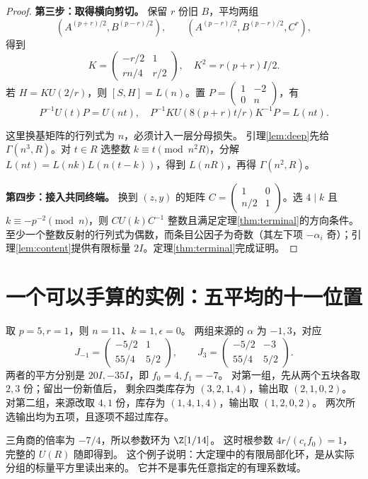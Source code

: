 \begin{proof}
\par\noindent\textbf{第三步：取得横向剪切。}
保留 $r$ 份旧 $B$，平均两组
\[
(A^{(p+r)/2},B^{(p-r)/2}),\qquad
(A^{(p-r)/2},B^{(p-r)/2},C^r),
\]
得到
\[
K=\begin{pmatrix}-r/2&1\\rn/4&r/2\end{pmatrix},\quad K^2=r(p+r)I/2.
\]
若 $H=KU(2/r)$，则 $[S,H]=L(n)$。置 $P=\left(\begin{smallmatrix}1&-2\\0&n\end{smallmatrix}\right)$，有
\[
P^{-1}U(t)P=U(nt),\quad
P^{-1}KU(8(p+r)t/r)K^{-1}P=L(nt).
\]

这里换基矩阵的行列式为 $n$，必须计入一层分母损失。
引理\ref{lem:deep}先给 $\Gamma(n^3,R)$。对 $t\in R$ 选整数 $k\equiv t\pmod{n^2R}$，分解 $L(nt)=L(nk)L(n(t-k))$，得到 $L(nR)$，再得 $\Gamma(n^2,R)$。

\par\noindent\textbf{第四步：接入共同终端。}
换到 $(z,y)$ 的矩阵 $C=\left(\begin{smallmatrix}1&0\\n/2&1\end{smallmatrix}\right)$。选 $4\mid k$ 且 $k\equiv-p^{-2}\pmod n$，则 $CU(k)C^{-1}$ 整数且满足定理\ref{thm:terminal}的方向条件。至少一个整数反射的行列式为偶数，而条目公因子为奇数（其左下项 $-\alpha_i$ 奇）；引理\ref{lem:content}提供有限标量 $2I$。定理\ref{thm:terminal}完成证明。
\end{proof}

\section{一个可以手算的实例：五平均的十一位置}
取 $p=5,r=1$，则 $n=11$、$k=1,\epsilon=0$。
两组来源的 $\alpha$ 为 $-1,3$，对应
\[
J_{-1}=\begin{pmatrix}-5/2&1\\55/4&5/2\end{pmatrix},
\qquad
J_3=\begin{pmatrix}-5/2&-3\\55/4&5/2\end{pmatrix}.
\]
两者的平方分别是 $20I,-35I$，即 $f_0=4,f_1=-7$。
对第一组，先从两个五块各取 $2,3$ 份；留出一份新值后，
剩余四类库存为 $(3,2,1,4)$，输出取 $(2,1,0,2)$。
对第二组，来源改取 $4,1$ 份，库存为 $(1,4,1,4)$，输出取 $(1,2,0,2)$。
两次所选输出均为五项，且逐项不超过库存。

三角商的倍率为 $-7/4$，所以参数环为 $\Z[1/14]$。
这时根参数 $4r/(c_\epsilon f_0)=1$，完整的 $U(R)$ 随即得到。
这个例子说明：大定理中的有限局部化环，是从实际分组的标量平方里读出来的。
它并不是事先任意指定的有理系数域。


